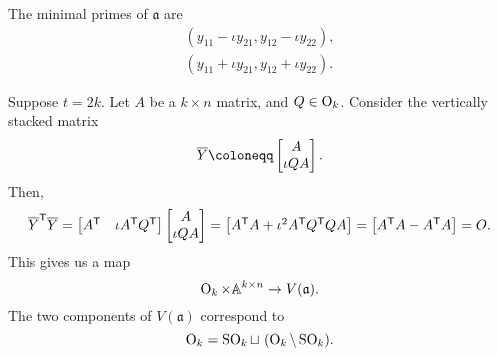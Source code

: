 \documentclass[12pt]{article}
\begin{document}
The minimal primes of $\mathfrak{a}$ are
\begin{align*} 
	(y_{11} - \iota y_{21}, y_{12} - \iota y_{22}), \\
	(y_{11} + \iota y_{21}, y_{12} + \iota y_{22}).
\end{align*}

\begin{rem}
	Suppose $t = 2k$. Let $A$ be a $k \times n$ matrix, and $Q \in \operatorname{O}_{k}$. Consider the vertically stacked matrix
	\begin{equation*} 
		\overline{Y} \coloneqq \col{A}{\iota QA}.
	\end{equation*}
	Then,
	\begin{equation*} 
		\overline{Y}^{\mathsf{T}} \overline{Y} = 
		\begin{bmatrix}
			A^{\mathsf{T}} & \iota A^{\mathsf{T}} Q^{\mathsf{T}}
		\end{bmatrix}
		\begin{bmatrix} A \\ \iota QA \end{bmatrix} = 
		\begin{bmatrix}A^{\mathsf{T}} A + \iota^{2} A^{\mathsf{T}} Q^{\mathsf{T}} Q A \end{bmatrix} = 
		\begin{bmatrix}A^{\mathsf{T}} A - A^{\mathsf{T}} A \end{bmatrix} = O.
	\end{equation*}
	This gives us a map
	\begin{equation*} 
		\operatorname{O}_{k} \times \mathbb{A}^{k \times n} \to V(\mathfrak{a}).
	\end{equation*}
	The two components of $V(\mathfrak{a})$ correspond to
	\begin{equation*} 
		\OO_{k} = \SO_{k} \sqcup\ (\OO_{k} \setminus \SO_{k}).
	\end{equation*}
\end{rem}

\printbibliography
\end{document}

